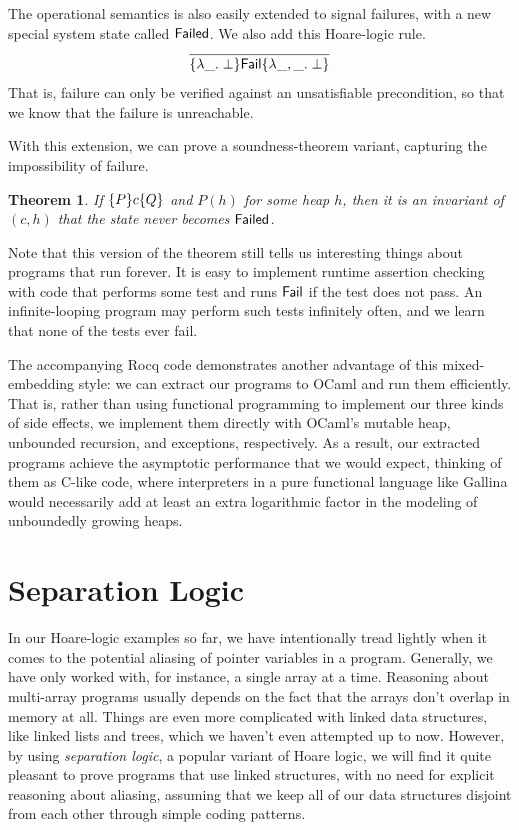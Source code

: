 \documentclass{amsbook}
\newtheorem{theorem}{Theorem}[chapter]
\theoremstyle{definition}
\theoremstyle{remark}
\numberwithin{section}{chapter}
\numberwithin{equation}{chapter}
\begin{document}
The operational semantics is also easily extended to signal failures, with a new special system state called $\mathsf{Failed}$.
We also add this Hoare-logic rule.
$$\infer{\hoare{\lambda \_. \; \bot}{\mt{Fail}}{\lambda \_, \_. \; \bot}}{}$$
That is, failure can only be verified against an unsatisfiable precondition, so that we know that the failure is unreachable.

With this extension, we can prove a soundness-theorem variant, capturing the impossibility of failure.

\invariants
\begin{theorem}
  If $\{P\} c \{Q\}$ and $P(h)$ for some heap $h$, then it is an invariant of $(c, h)$ that the state never becomes $\mathsf{Failed}$.
\end{theorem}

Note that this version of the theorem still tells us interesting things about programs that run forever.
It is easy to implement runtime assertion checking with code that performs some test and runs $\mathsf{Fail}$ if the test does not pass.
An infinite-looping program may perform such tests infinitely often, and we learn that none of the tests ever fail.

The accompanying Rocq code demonstrates another advantage of this mixed-embedding style: we can extract our programs to OCaml and run them efficiently.
That is, rather than using functional programming to implement our three kinds of side effects, we implement them directly with OCaml's mutable heap, unbounded recursion, and exceptions, respectively.
As a result, our extracted programs achieve the asymptotic performance that we would expect, thinking of them as C-like code, where interpreters in a pure functional language like Gallina would necessarily add at least an extra logarithmic factor in the modeling of unboundedly growing heaps.



\chapter{Separation Logic}\label{seplog}

In our Hoare-logic examples so far, we have intentionally tread lightly when it comes to the potential aliasing of pointer variables in a program.
Generally, we have only worked with, for instance, a single array at a time.
Reasoning about multi-array programs usually depends on the fact that the arrays don't overlap in memory at all.
Things are even more complicated with linked data structures, like linked lists and trees, which we haven't even attempted up to now.
However, by using \emph{separation logic}, a popular variant of Hoare logic, we will find it quite pleasant to prove programs that use linked structures, with no need for explicit reasoning about aliasing, assuming that we keep all of our data structures disjoint from each other through simple coding patterns.
\end{document}
